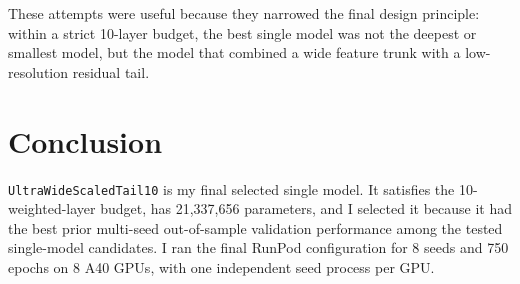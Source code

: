\documentclass[11pt]{article}
\begin{document}
These attempts were useful because they narrowed the final design principle: within a
strict 10-layer budget, the best single model was not the deepest or smallest model, but
the model that combined a wide feature trunk with a low-resolution residual tail.

\section{Conclusion}

\texttt{UltraWideScaledTail10} is my final selected single model. It satisfies the
10-weighted-layer budget, has 21,337,656 parameters, and I selected it because it had the
best prior multi-seed out-of-sample validation performance among the tested single-model
candidates. I ran the final RunPod configuration for 8 seeds and 750 epochs on 8 A40 GPUs,
with one independent seed process per GPU.
\end{document}
